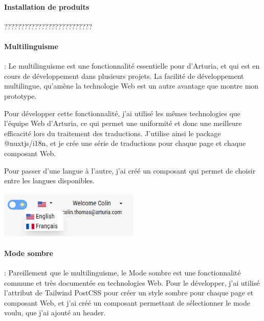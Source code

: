 \documentclass[francais]{rapportPFE}  %
\begin{document}
\paragraph{Installation de produits} ??????????????????????????
\paragraph{Multilinguisme}: Le multilinguisme est une fonctionnalité essentielle pour d'Arturia, et qui est en cours de développement dans plusieurs projets. La facilité de développement multilingue, qu'amène la technologie Web est un autre avantage que montre mon prototype.

Pour développer cette fonctionnalité, j'ai utilisé les mêmes technologies que l'équipe Web d'Arturia, ce qui permet une uniformité et donc une meilleure efficacité lors du traitement des traductions. J'utilise ainsi le package @nuxtjs/i18n, et je crée une série de traductions pour chaque page et chaque composant Web.

Pour passer d'une langue à l'autre, j'ai créé un composant qui permet de choisir entre les langues disponibles.

\begin{center}
	\centering
	\includegraphics[width=0.5\textwidth]{graphics/languages.png}
	\begin{tiny}
	\end{tiny}
	\label{fig}
\end{center}

\paragraph{Mode sombre}: Pareillement que le multilinguisme, le Mode sombre est une fonctionnalité commune et très documentée en technologies Web. Pour le développer, j'ai utilisé l'attribut de Tailwind PostCSS pour créer un style sombre pour chaque page et composant Web, et j'ai créé un composant permettant de sélectionner le mode voulu, que j'ai ajouté au header.
\end{document}
